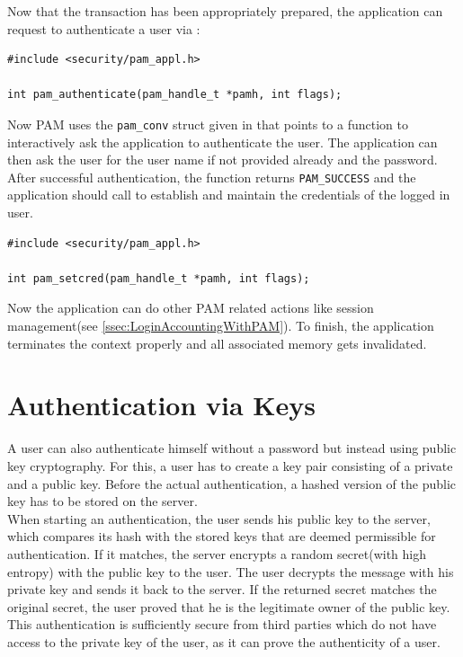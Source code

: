 \documentclass[10pt,a4paper,titlepage,twoside,english,final]{zhawreprt}
\begin{document}
Now that the transaction has been appropriately prepared, the application can request to authenticate a user via \cite{pam_authenticate}:
\setlistingC
\begin{lstlisting}[caption={\gls{PAM} authentication},label=lst:PAMAuthentication]
#include <security/pam_appl.h>

int pam_authenticate(pam_handle_t *pamh, int flags);
\end{lstlisting}

Now \gls{PAM} uses the \texttt{pam\_conv} struct given in \cite{pam_start} that points to a function to interactively ask the application to authenticate the user. The application can then ask the user for the user name if not provided already and the password. After successful authentication, the function returns \texttt{PAM\_SUCCESS} and the application should call \cite{pam_setcred} to establish and maintain the credentials of the logged in user.
\setlistingC
\begin{lstlisting}[caption={\gls{PAM} credential setting},label=lst:PAMCredSet]
#include <security/pam_appl.h>

int pam_setcred(pam_handle_t *pamh, int flags);
\end{lstlisting}

Now the application can do other \gls{PAM} related actions like session management(see \ref{ssec:LoginAccountingWithPAM}). To finish, the application terminates the context properly and all associated memory gets invalidated.

\section{Authentication via Keys}\label{sec:DesignAuthViaKeys}
A user can also authenticate himself without a password but instead using public key cryptography. For this, a user has to create a key pair consisting of a private and a public key. Before the actual authentication, a hashed version of the public key has to be stored on the server.\\
When starting an authentication, the user sends his public key to the server, which compares its hash with the stored keys that are deemed permissible for authentication. If it matches, the server encrypts a random secret(with high entropy) with the public key to the user. The user decrypts the message with his private key and sends it back to the server. If the returned secret matches the original secret, the user proved that he is the legitimate owner of the public key.\\
This authentication is sufficiently secure from third parties which do not have access to the private key of the user, as it can prove the authenticity of a user.
\end{document}
